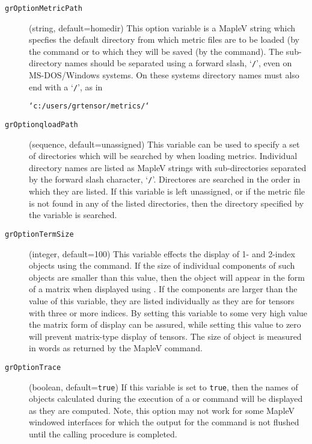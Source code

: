 \documentclass{article}
\begin{document}
\begin{description}
  \item[\texttt{grOptionMetricPath}] (string, default=homedir) This
    option variable is a MapleV string which specfies the default
    directory from which metric files are to be loaded (by the
     command or to which they will be saved (by the
     command).  The sub-directory names should be
    separated using a forward slash, `\texttt{/}', even on MS-DOS/Windows
    systems. On these systems directory names must also end with
    a `\texttt{/}', as in
    \begin{center}
      \texttt{`c:/users/grtensor/metrics/`}
    \end{center}

  \item[\texttt{grOptionqloadPath}] (sequence, default=unassigned)
    This variable can be used to specify a set of directories which
    will be searched by  when loading metrics. Individual
    directory names are listed as MapleV strings with sub-directories
    separated by the forward slash character, `\texttt{/}'. Directores
    are searched in the order in which they are listed. If this
    variable is left unassigned, or if the metric file is not found in
    any of the listed directories, then the directory specified by the
     variable is searched.

  \item[\texttt{grOptionTermSize}] (integer, default=100) This
    variable effects the display of 1- and 2-index objects using the
     command. If the size of individual components of
    such objects are smaller than this value, then the object will
    appear in the form of a matrix when displayed using
    . If the components are larger than the value of
    this variable, they are listed individually as they are for
    tensors with three or more indices. By setting this variable to
    some very high value the matrix form of display can be assured,
    while setting this value to zero will prevent matrix-type display
    of tensors. The size of object is measured in words as returned by
    the MapleV  command.

  \item[\texttt{grOptionTrace}] (boolean, default=\texttt{true}) If
    this variable is set to \texttt{true}, then the names of objects
    calculated during the execution of a  or
     command will be displayed as they are
    computed. Note, this option may not work for some MapleV windowed
    interfaces for which the output for the  command
    is not flushed until the calling procedure is completed.


\end{description}
\end{document}
